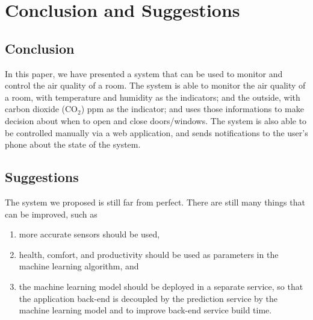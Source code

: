 \section{Conclusion and Suggestions}

\subsection{Conclusion}
In this paper, we have presented a system that can be
used to monitor and control the air quality of a room.
The system is able to monitor the air quality of a room,
with temperature and humidity as the indicators; and
the outside, with carbon dioxide (CO$_2$) ppm as the indicator;
and uses those informations to make decision about when to
open and close doors/windows.
The system is also able to be controlled manually via a web
application, and sends notifications to the user's phone
about the state of the system.

\subsection{Suggestions}
The system we proposed is still far from perfect.
There are still many things that can be improved, such as
\begin{enumerate}
      \item more accurate sensors should be used,
      \item health, comfort, and productivity should be used as parameters in
            the machine learning algorithm, and
      \item the machine learning model should be deployed in a separate service,
            so that the application back-end is decoupled by the prediction
            service by the machine learning model and to improve back-end service
            build time.
\end{enumerate}
